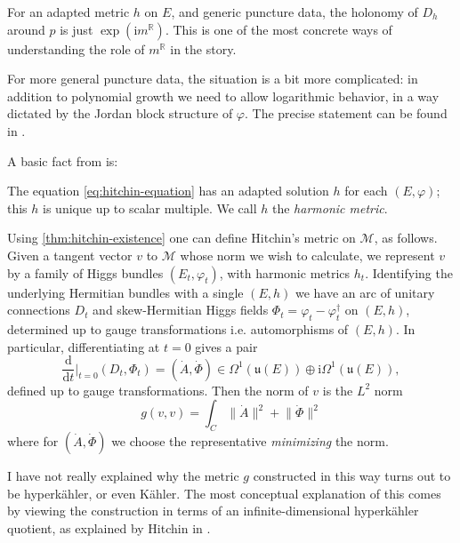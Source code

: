 \documentclass[12pt,letterpaper,reqno]{article}
\numberwithin{equation}{section}
\newcommand{\fu}{{\mathfrak u}}
\newcommand{\cM}{\ensuremath{\mathcal M}}
\newcommand{\R}{\ensuremath{\mathbb R}}
\newcommand{\kahler}{K\"ahler\xspace}
\newcommand{\hk}{hyperk\"ahler\xspace}
\newcommand{\Hk}{Hyperk\"ahler\xspace}
\newcommand{\I}{{\mathrm i}}
\newcommand{\de}{\mathrm{d}}
\newcommand{\norm}[1]{\lVert#1\rVert}
\newcommand{\ti}[1]{\textit{#1}}
\newcommand{\fixme}[1]{{\color{orange}{[#1]}}}
\begin{document}
\begin{remark}
For an adapted metric $h$ on $E$, and generic puncture data, 
the holonomy of $D_h$ around $p$
is just $\exp(\I m^\R)$. This is one of the most concrete ways
of understanding the role of $m^\R$ in the story.
\end{remark}

For more general puncture data, the situation is a bit 
more complicated: in addition to polynomial growth
we need to allow logarithmic behavior, in a way dictated
by the Jordan block structure of $\varphi$.
The precise statement can be found in \cite{hbnc}.

A basic fact from \cite{hbnc} is:
\begin{thm} \label{thm:hitchin-existence}
The equation \eqref{eq:hitchin-equation} has an
adapted solution $h$ for each $(E,\varphi)$;
this $h$ is unique up to scalar multiple.
We call $h$ the \ti{harmonic metric}.
\end{thm}

Using \autoref{thm:hitchin-existence}
one can define Hitchin's metric on $\cM$, as follows.
Given a tangent vector $v$ to $\cM$ whose norm we wish to calculate, we represent $v$ by a family of Higgs bundles
$(E_t,\varphi_t)$, with harmonic metrics $h_t$.
Identifying the underlying Hermitian bundles with a single $(E,h)$
we have an arc of unitary connections $D_t$ and skew-Hermitian 
Higgs fields $\Phi_t = \varphi_t - \varphi_t^\dagger$ 
on $(E,h)$, determined up to gauge transformations i.e. 
automorphisms of $(E,h)$.
In particular, differentiating at $t = 0$ gives a pair
\begin{equation}
\frac{\de}{\de t}\Bigg\rvert_{t=0} (D_t, \Phi_t) = 
(\dot A, \dot \Phi) \in \Omega^1(\fu(E)) \oplus \I \Omega^{1}(\fu(E)),
\end{equation}
defined up to gauge transformations.
Then the norm of $v$ is the $L^2$ norm
\begin{equation}
  g(v,v) = \int_C \norm{\dot A}^2 + \norm{\dot \Phi}^2
\end{equation}
where for $(\dot A, \dot \Phi)$ we choose the representative
\ti{minimizing} the norm.

\fixme{ref Konno}

\begin{remark}[\Hk quotient] I have not really explained
why the metric $g$ constructed in this way turns out to 
be \hk, or even \kahler. The most conceptual explanation
of this comes by viewing the construction in terms of 
an infinite-dimensional \hk quotient, as explained by
Hitchin in \cite{MR89a:32021}.
\end{remark}
\end{document}
